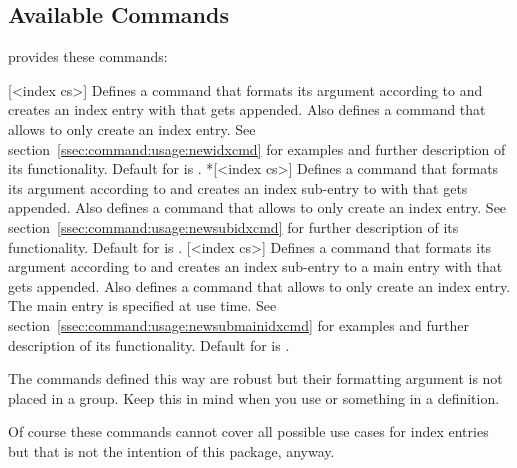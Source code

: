 \documentclass{cnpkgdoc}
\begin{document}
\subsection{Available Commands}
\idxcmds provides these commands:
\begin{beschreibung}
 [<index cs>]{}\newline
   Defines a command  that formats its argument according to
    and creates an index entry with 
   that gets  appended. Also defines a command 
   that allows to only create an index entry. See section~\ref{ssec:command:usage:newidxcmd}
   for examples and further description of its functionality. Default for
    is .
 *[<index cs>]{}\newline
   Defines a command  that formats its argument according to
    and creates an index sub-entry to 
   with  that gets  appended. Also
   defines a command  that allows to only create an index entry.
   See section~\ref{ssec:command:usage:newsubidxcmd} for further description of
   its functionality. Default for  is .
 [<index cs>]{}\newline
   Defines a command  that formats its argument according to
    and creates an index sub-entry to a main entry with
    that gets  appended. Also defines a
   command  that allows to only create an index entry. The main entry
   is specified at use time. See section~\ref{ssec:command:usage:newsubmainidxcmd}
   for examples and further description of its functionality. Default for
    is .
\end{beschreibung}

The commands  defined this way are robust but their formatting argument
is not placed in a group. Keep this in mind when you use  or
something in a definition.

Of course these commands cannot cover all possible use cases for index entries
but that is not the intention of this package, anyway.
\end{document}
